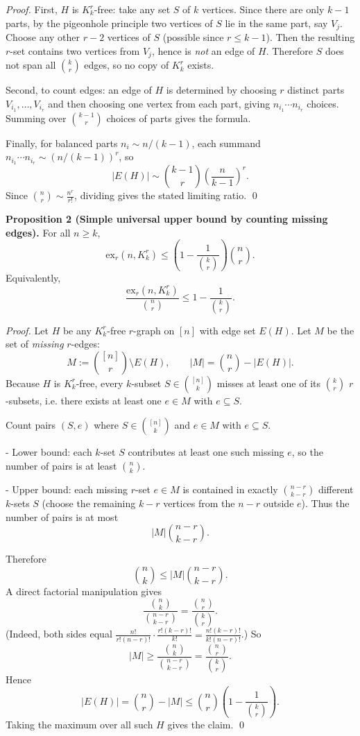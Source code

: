\emph{Proof.}
First, $H$ is $K_k^r$-free: take any set $S$ of $k$ vertices. Since there are only $k-1$ parts, by the pigeonhole principle two vertices of $S$ lie in the same part, say $V_j$.
Choose any other $r-2$ vertices of $S$ (possible since $r\le k-1$). Then the resulting $r$-set contains two vertices from $V_j$, hence is \emph{not} an edge of $H$. Therefore $S$ does not span all $\binom{k}{r}$ edges, so no copy of $K_k^r$ exists.

Second, to count edges: an edge of $H$ is determined by choosing $r$ distinct parts $V_{i_1},\dots,V_{i_r}$ and then choosing one vertex from each part, giving $n_{i_1}\cdots n_{i_r}$ choices. Summing over $\binom{k-1}{r}$ choices of parts gives the formula.

Finally, for balanced parts $n_i\sim n/(k-1)$, each summand $n_{i_1}\cdots n_{i_r}\sim (n/(k-1))^r$, so
\[
|E(H)|\sim \binom{k-1}{r}\left(\frac{n}{k-1}\right)^r.
\]
Since $\binom{n}{r}\sim \frac{n^r}{r!}$, dividing gives the stated limiting ratio.
\qed

\medskip
\textbf{Proposition 2 (Simple universal upper bound by counting missing edges).}
For all $n\ge k$,
\[
\mathrm{ex}_r(n,K_k^r)\le \left(1-\frac{1}{\binom{k}{r}}\right)\binom{n}{r}.
\]
Equivalently,
\[
\frac{\mathrm{ex}_r(n,K_k^r)}{\binom{n}{r}}\le 1-\frac{1}{\binom{k}{r}}.
\]

\emph{Proof.}
Let $H$ be any $K_k^r$-free $r$-graph on $[n]$ with edge set $E(H)$. Let $M$ be the set of \emph{missing} $r$-edges:
\[
M:=\binom{[n]}{r}\setminus E(H),\qquad |M|=\binom{n}{r}-|E(H)|.
\]
Because $H$ is $K_k^r$-free, every $k$-subset $S\in\binom{[n]}{k}$ misses at least one of its $\binom{k}{r}$ $r$-subsets, i.e. there exists at least one $e\in M$ with $e\subseteq S$.

Count pairs $(S,e)$ where $S\in\binom{[n]}{k}$ and $e\in M$ with $e\subseteq S$.

- Lower bound: each $k$-set $S$ contributes at least one such missing $e$, so the number of pairs is at least $\binom{n}{k}$.

- Upper bound: each missing $r$-set $e\in M$ is contained in exactly $\binom{n-r}{k-r}$ different $k$-sets $S$ (choose the remaining $k-r$ vertices from the $n-r$ outside $e$). Thus the number of pairs is at most
\[
|M|\binom{n-r}{k-r}.
\]

Therefore
\[
\binom{n}{k}\le |M|\binom{n-r}{k-r}.
\]
A direct factorial manipulation gives
\[
\frac{\binom{n}{k}}{\binom{n-r}{k-r}} = \frac{\binom{n}{r}}{\binom{k}{r}}.
\]
(Indeed, both sides equal $\frac{n!}{r!(n-r)!}\cdot\frac{r!(k-r)!}{k!} = \frac{n!(k-r)!}{k!(n-r)!}$.)
So
\[
|M| \ge \frac{\binom{n}{k}}{\binom{n-r}{k-r}} = \frac{\binom{n}{r}}{\binom{k}{r}}.
\]
Hence
\[
|E(H)| = \binom{n}{r}-|M| \le \binom{n}{r}\left(1-\frac{1}{\binom{k}{r}}\right).
\]
Taking the maximum over all such $H$ gives the claim.
\qed

